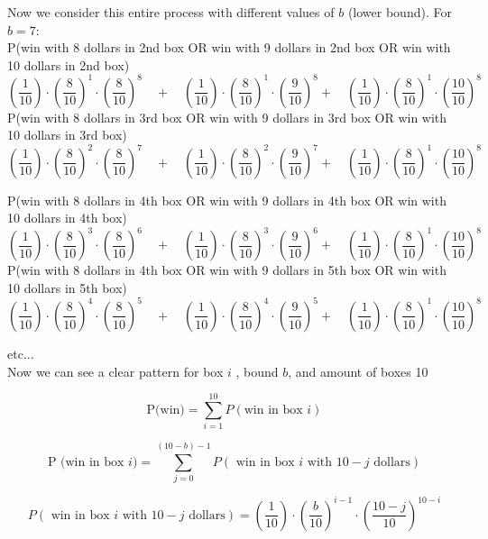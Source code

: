 \documentclass{report}
\begin{document}
\pagebreak

Now we consider this entire process with different values of $b$ (lower bound).
For $b=7$:
\\

P(win with 8 dollars in 2nd box OR win with 9 dollars in 2nd box OR win with 10 dollars in 2nd box)
\[
\left( \frac{1}{10} \right)\cdot \left( \frac{8}{10} \right)^{1}\cdot \left(\frac{8}{10} \right)^{8}
\quad
+
\quad
\left( \frac{1}{10} \right)\cdot \left( \frac{8}{10} \right)^{1}\cdot \left(\frac{9}{10} \right)^{8}
+
\quad
\left( \frac{1}{10} \right)\cdot \left( \frac{8}{10} \right)^{1}\cdot \left(\frac{10}{10} \right)^{8}
\]
P(win with 8 dollars in 3rd box OR win with 9 dollars in 3rd box OR win with 10 dollars in 3rd box)
\[
\left( \frac{1}{10} \right)\cdot \left( \frac{8}{10} \right)^{2}\cdot \left(\frac{8}{10} \right)^{7}
\quad
+
\quad
\left( \frac{1}{10} \right)\cdot \left( \frac{8}{10} \right)^{2}\cdot \left(\frac{9}{10} \right)^{7}
+
\quad
\left( \frac{1}{10} \right)\cdot \left( \frac{8}{10} \right)^{1}\cdot \left(\frac{10}{10} \right)^{8}
\]

P(win with 8 dollars in 4th box OR win with 9 dollars in 4th box OR win with 10 dollars in 4th box)
\[
\left( \frac{1}{10} \right)\cdot \left( \frac{8}{10} \right)^{3}\cdot \left(\frac{8}{10} \right)^{6}
\quad
+
\quad
\left( \frac{1}{10} \right)\cdot \left( \frac{8}{10} \right)^{3}\cdot \left(\frac{9}{10} \right)^{6}
+
\quad
\left( \frac{1}{10} \right)\cdot \left( \frac{8}{10} \right)^{1}\cdot \left(\frac{10}{10} \right)^{8}
\]
P(win with 8 dollars in 4th box OR win with 9 dollars in 5th box OR win with 10 dollars in 5th box)
\[
\left( \frac{1}{10} \right)\cdot \left( \frac{8}{10} \right)^{4}\cdot \left(\frac{8}{10} \right)^{5}
\quad
+
\quad
\left( \frac{1}{10} \right)\cdot \left( \frac{8}{10} \right)^{4}\cdot \left(\frac{9}{10} \right)^{5}
+
\quad
\left( \frac{1}{10} \right)\cdot \left( \frac{8}{10} \right)^{1}\cdot \left(\frac{10}{10} \right)^{8}
\]

etc... \\
Now we can see a clear pattern for box $i$ , bound $b$, and amount of boxes 10

\[ 
\textrm{P(win)} = \sum_{i=1}^{10} P ( \textrm{win in box } i) 
\]

\[
\textrm{P (win in box  }i) = \sum_{j=0}^{(10-b)-1} P ( \textrm{ win in box } i \textrm{ with } 10-j \textrm{ dollars}) 
\]

\[
P ( \textrm{ win in box } i \textrm{ with } 10-j \textrm{ dollars}) =
\left( \frac{1}{10} \right)\cdot \left( \frac{b}{10} \right)^{i-1}\cdot \left(\frac{10-j}{10} \right)^{10-i} 
\]
\\
\end{document}
